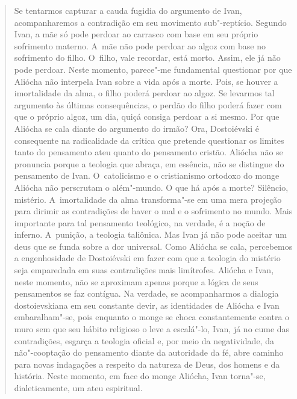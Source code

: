 {\begin{quote}
Se tentarmos capturar a cauda fugidia do argumento de Ivan,
acompanharemos a contradição em seu movimento sub"-reptício. Segundo
Ivan, a mãe só pode perdoar ao carrasco com base em seu próprio
sofrimento materno. A~mãe não pode perdoar ao algoz com base no
sofrimento do filho. O~filho, vale recordar, está morto. Assim, ele já
não pode perdoar. Neste momento, parece"-me fundamental questionar por
que Aliócha não interpela Ivan sobre a vida após a morte. Pois, se
houver a imortalidade da alma, o filho poderá perdoar ao algoz. Se
levarmos tal argumento às últimas consequências, o perdão do filho
poderá fazer com que o próprio algoz, um dia, quiçá consiga perdoar a si
mesmo. Por que Aliócha se cala diante do argumento do irmão? Ora,
Dostoiévski é consequente na radicalidade da crítica que pretende
questionar os limites tanto do pensamento ateu quanto do pensamento
cristão. Aliócha não se pronuncia porque a teologia que abraça, em
essência, não se distingue do pensamento de Ivan. O~catolicismo e o
cristianismo ortodoxo do monge Aliócha não perscrutam o além"-mundo. O
que há após a morte? Silêncio, mistério. A~imortalidade da alma
transforma"-se em uma mera projeção para dirimir as contradições de haver
o mal e o sofrimento no mundo. Mais importante para tal pensamento
teológico, na verdade, é a noção de inferno. A~punição, a teologia
taliônica. Mas Ivan já não pode aceitar um deus que se funda sobre a dor
universal. Como Aliócha se cala, percebemos a engenhosidade de
Dostoiévski em fazer com que a teologia do mistério seja emparedada em
suas contradições mais limítrofes. Aliócha e Ivan, neste momento, não se
aproximam apenas porque a lógica de seus pensamentos se faz contígua. Na
verdade, se acompanharmos a dialogia dostoievskiana em seu constante
devir, as identidades de Aliócha e Ivan embaralham"-se, pois enquanto o
monge se choca constantemente contra o muro sem que seu hábito religioso
o leve a escalá"-lo, Ivan, já no cume das contradições, esgarça a
teologia oficial e, por meio da negatividade, da não"-cooptação do
pensamento diante da autoridade da fé, abre caminho para novas
indagações a respeito da natureza de Deus, dos homens e da história.
Neste momento, em face do monge Aliócha, Ivan torna"-se, dialeticamente,
um ateu espiritual.


\end{quote}}
